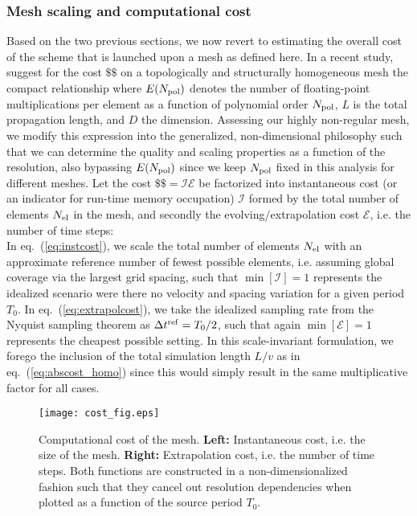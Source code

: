 \subsubsection{Mesh scaling and computational cost}
%
Based on the two previous sections, we now revert to estimating the overall 
cost of the scheme that is launched upon a mesh as defined here. 
In a recent study, \citet{Ampuero+:07} suggest for the cost
${\$\$}$ on a topologically and structurally homogeneous mesh the 
compact relationship
%
\eq\label{eq:abscost_homo}
\en
%
where $E(N_{\rm pol})$ denotes the number of floating-point multiplications per element 
as a function of polynomial order $N_{\rm pol}$, $L$ is the total propagation length, 
and $D$ the dimension.
Assessing our highly non-regular mesh, we modify this expression into
the generalized, non-dimensional philosophy such that we can 
determine the quality and scaling properties as a function of the resolution, 
also bypassing $E(N_{\rm pol})$ since we keep $N_{\rm pol}$ fixed in this 
analysis for different meshes.
Let the cost $\$\$={\mathcal I}{\mathcal E}$ be factorized into
instantaneous cost (or an indicator for run-time memory occupation)
${\mathcal I}$ formed by the total number of elements $N_{\rm el}$ in the mesh, 
and secondly the evolving/extrapolation cost ${\mathcal E}$, 
i.e. the number of time steps:
%
\eqa
{} \label{eq:instcost}\\
\label{eq:extrapolcost}%
\ena
%
In eq.~(\ref{eq:instcost}), we scale the total number of elements $N_{\rm el}$ with an approximate 
reference number of fewest possible elements, 
i.e. assuming global coverage via the largest grid spacing, such that $\min[{\mathcal I}]=1$ 
represents the idealized scenario were there no velocity and spacing variation for a given period $T_0$. 
In eq.~(\ref{eq:extrapolcost}), we take the idealized sampling rate from the Nyquist sampling 
theorem as $\Delta{t}^{\rm ref}=T_0/2$, such that again $\min[{\mathcal E}]=1$ represents the 
cheapest possible setting. In this scale-invariant formulation, we forego the inclusion of the total 
simulation length $L/v$ as in eq.~(\ref{eq:abscost_homo}) since this would simply result in the 
same multiplicative factor for all cases.
%
\begin{figure}[tb!]
\begin{center}
\texttt{[image: cost\_fig.eps]}
\caption{Computational cost of the mesh. \textbf{Left:} Instantaneous cost, i.e. the 
size of the mesh. \textbf{Right:} Extrapolation cost, i.e. the number of time steps. 
Both functions are constructed in a non-dimensionalized fashion
such that they cancel out resolution dependencies when 
plotted as a function of the source period $T_0$.}
\label{img:cost}
\end{center}
\end{figure}
